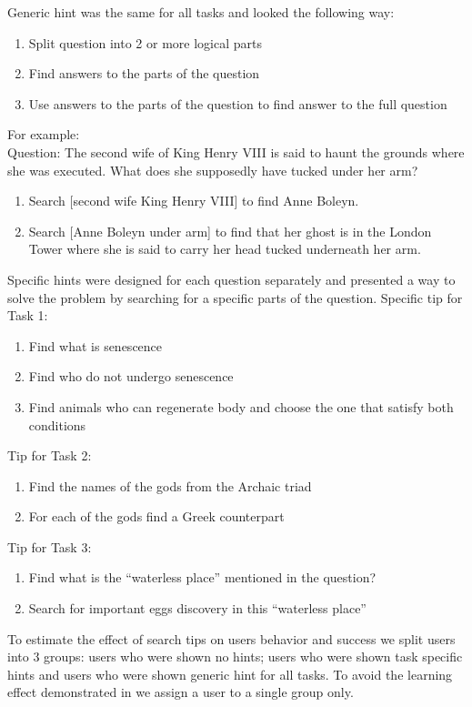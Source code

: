 \documentclass{sig-alternate}
\begin{document}
Generic hint was the same for all tasks and looked the following way:
\begin{enumerate}
\item Split question into 2 or more logical parts
\item Find answers to the parts of the question
\item Use answers to the parts of the question to find answer to the full question
\end{enumerate}
For example:\\
Question: The second wife of King Henry VIII is said to haunt the grounds where she was executed. What does she supposedly have tucked under her arm?
\begin{enumerate}
\item Search [second wife King Henry VIII] to find Anne Boleyn.
\item Search [Anne Boleyn under arm] to find that her ghost is in the London Tower where she is said to carry her head tucked underneath her arm.
\end{enumerate}

Specific hints were designed for each question separately and presented a way to solve the problem by searching for a specific parts of the question.
Specific tip for Task 1:
\begin{enumerate}
\item Find what is senescence
\item Find who do not undergo senescence
\item Find animals who can regenerate body and choose the one that satisfy both conditions
\end{enumerate}

Tip for Task 2:
\begin{enumerate}
\item Find the names of the gods from the Archaic triad
\item For each of the gods find a Greek counterpart
\end{enumerate}

Tip for Task 3:
\begin{enumerate}
\item Find what is the ``waterless place'' mentioned in the question?
\item Search for important eggs discovery in this ``waterless place''
\end{enumerate}

To estimate the effect of search tips on users behavior and success we split users into 3 groups: users who were shown no hints; users who were shown task specific hints and users who were shown generic hint for all tasks.
To avoid the learning effect demonstrated in \cite{Moraveji:2011:MIU:2009916.2009966} we assign a user to a single group only.
\end{document}
